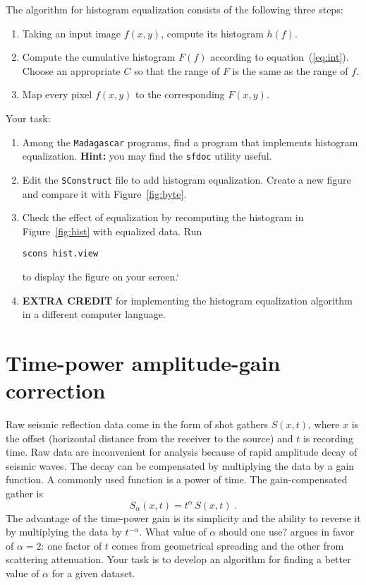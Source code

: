 The algorithm for histogram equalization consists of the following
three steps:
\begin{enumerate}
\item Taking an input image $f(x,y)$, compute its histogram $h(f)$.
\item Compute the cumulative histogram $F(f)$ according to 
equation~(\ref{eq:int}). Choose an appropriate $C$ so that the range
of $F$ is the same as the range of $f$.
\item Map every pixel $f(x,y)$ to the corresponding $F(x,y)$.
\end{enumerate}

Your task:
\begin{enumerate}
\item Among the \texttt{Madagascar} programs, find a program that 
implements histogram equalization. \textbf{Hint:} you may find
the \texttt{sfdoc} utility useful.
\item Edit the \texttt{SConstruct} file to add histogram equalization. 
Create a new figure and compare it with Figure~\ref{fig:byte}.
\item Check the effect of equalization by recomputing the histogram 
in Figure~\ref{fig:hist} with equalized data. Run
\begin{verbatim}
scons hist.view
\end{verbatim}
to display the figure on your screen.`
\item \textbf{EXTRA CREDIT} for implementing the histogram
equalization algorithm in a different computer language.
\end{enumerate}	

\newpage

\lstset{language=python,numbers=left,numberstyle=\tiny,showstringspaces=false}


\section{Time-power amplitude-gain correction}

Raw seismic reflection data come in the form of shot gathers $S(x,t)$,
where $x$ is the offset (horizontal distance from the receiver to the
source) and $t$ is recording time. Raw data are inconvenient for
analysis because of rapid amplitude decay of seismic waves. The decay
can be compensated by multiplying the data by a gain function. A
commonly used function is a power of time. The gain-compensated gather
is
\begin{equation}
\label{eq:tpow}
S_\alpha(x,t) = t^{\alpha}\,S(x,t)\;.
\end{equation}
The advantage of the time-power gain is its simplicity and the ability
to reverse it by multiplying the data by $t^{-\alpha}$. What value of
$\alpha$ should one use? \cite{iei} argues in favor of $\alpha=2$:
one factor of $t$ comes from geometrical spreading and the other from
scattering attenuation. Your task is to develop an algorithm for finding
a better value of $\alpha$ for a given dataset.


